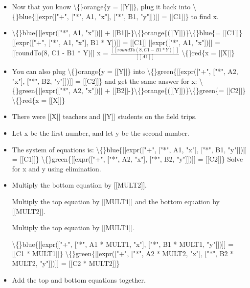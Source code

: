 \documentclass{article}
\begin{document}
\begin{itemize}
                            [[expr(["*", roundTo(8, B1 * MULT1 + B2 * MULT2), "y"])]] = [[roundTo(8, C1 * MULT1 + C2 * MULT2)]]
                        
                        
                            y = $\frac{[[roundTo(8, C1 * MULT1 + C2 * MULT2)]]}{[[roundTo(8, B1 * MULT1 + B2 * MULT2)]]}$
                        \textbackslash\{\}orange\{y = [[Y]]\}
  \item Now that you know \textbackslash\{\}orange\{y = [[Y]]\}, plug it back into  \textbackslash\{\}blue\{[[expr(["+", ["*", A1, "x"], ["*", B1, "y"]])]] = [[C1]]\} to find x.
  \item \textbackslash\{\}blue\{[[expr(["*", A1, "x"])]] + [[B1]]-\}\textbackslash\{\}orange\{([[Y]])\}\textbackslash\{\}blue\{= [[C1]]\}
                        [[expr(["+", ["*", A1, "x"], B1 * Y])]] = [[C1]]
                        [[expr(["*", A1, "x"])]] = [[roundTo(8, C1 - B1 * Y)]]
                        x = $\frac{[[roundTo( 8, C1 - B1 * Y )]]}{[[A1]]}$
                        \textbackslash\{\}red\{x = [[X]]\}
  \item You can also plug \textbackslash\{\}orange\{y = [[Y]]\} into  \textbackslash\{\}green\{[[expr(["+", ["*", A2, "x"], ["*", B2, "y"]])]] = [[C2]]\} and get the same answer for x:
                        \textbackslash\{\}green\{[[expr(["*", A2, "x"])]] + [[B2]]-\}\textbackslash\{\}orange\{([[Y]])\}\textbackslash\{\}green\{= [[C2]]\}
                        \textbackslash\{\}red\{x = [[X]]\}
  \item There were [[X]] teachers and [[Y]] students on the field trips.
  \item Let x be the first number, and let y be the second number.
  \item The system of equations is:
                        \textbackslash\{\}blue\{[[expr(["+", ["*", A1, "x"], ["*", B1, "y"]])]] = [[C1]]\}
                        \textbackslash\{\}green\{[[expr(["+", ["*", A2, "x"], ["*", B2, "y"]])]] = [[C2]]\}
                        Solve for x and y using elimination.
  \item Multiply the bottom equation by [[MULT2]].
                        
                            Multiply the top equation by [[MULT1]] and the bottom equation by [[MULT2]].
                        
                            Multiply the top equation by [[MULT1]].
                        
                        \textbackslash\{\}blue\{[[expr(["+", ["*", A1 * MULT1, "x"], ["*", B1 * MULT1, "y"]])]] = [[C1 * MULT1]]\}
                        \textbackslash\{\}green\{[[expr(["+", ["*", A2 * MULT2, "x"], ["*", B2 * MULT2, "y"]])]] = [[C2 * MULT2]]\}
  \item Add the top and bottom equations together.
                        

\end{itemize}
\end{document}
